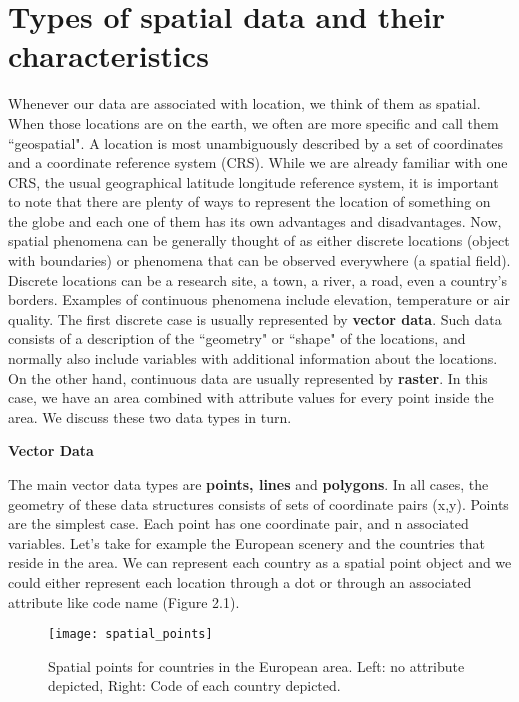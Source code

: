 \documentclass[12pt,a4paper,oneside]{book}
\theoremstyle{plain}
\theoremstyle{definition}
\begin{document}
{\section{Types of spatial data and their characteristics}
Whenever our data are associated with location, we think of them as spatial. When those locations are on the earth, we often are more specific and call them ``geospatial". A location is most unambiguously described by a set of coordinates and a coordinate reference system (CRS). While we are already familiar with one CRS, the usual geographical latitude longitude  reference system, it is important to note that there are plenty of ways to represent the location of something on the globe and each one of them has its own advantages and disadvantages. 
\vspace{4mm}\newline
Now, spatial phenomena can be generally thought of as either discrete locations (object with boundaries) or phenomena that can be observed everywhere (a spatial field). Discrete locations can be a research site, a town, a river, a road, even a country's borders. Examples of continuous phenomena include elevation, temperature or air quality.
\vspace{4mm}\newline
The first discrete case is usually represented by  \textbf{vector data}. Such data consists of a description of the ``geometry" or ``shape" of the locations, and normally also include variables with additional information about the locations. On the other hand, continuous data are usually represented by \textbf{raster}. In this case, we have an area combined with attribute values for every point inside the area. We discuss these two data types in turn.  
\vspace{2mm}\newline 
\begin{flushleft}
\textbf{Vector Data}
\end{flushleft}
The main vector data types are \textbf{points, lines} and \textbf{polygons}. In all cases, the geometry of these data structures consists of sets of coordinate pairs (x,y). Points  are the simplest case. Each point has one coordinate pair, and n associated variables. Let's take for example the European scenery and the countries that reside in the area. We can represent each country as a spatial point object and we could either represent each location through a dot or through an associated attribute like code name (Figure 2.1).  
\begin{figure}[h]
\begin{center}
\texttt{[image: spatial\_points]}
\caption{Spatial points for countries in the European area. Left: no attribute depicted, Right: Code of each country depicted.}
\end{center}
\end{figure}

}
\end{document}
